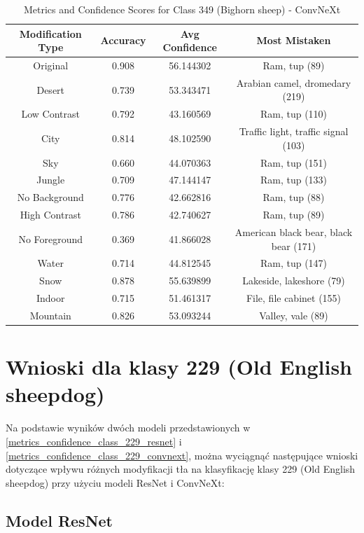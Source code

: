 \begin{table}
	\centering
	\begin{tabular}{|c|c|c|c|}
		\hline
		\textbf{Modification Type} & \textbf{Accuracy} & \textbf{Avg Confidence} & \textbf{Most Mistaken} \\
		\hline
		Original & 0.908 & 56.144302 & Ram, tup (89) \\
		\hline
		Desert & 0.739 & 53.343471 & Arabian camel, dromedary (219) \\
		\hline
		Low Contrast & 0.792 & 43.160569 & Ram, tup (110) \\
		\hline
		City & 0.814 & 48.102590 & Traffic light, traffic signal (103) \\
		\hline
		Sky & 0.660 & 44.070363 & Ram, tup (151) \\
		\hline
		Jungle & 0.709 & 47.144147 & Ram, tup (133) \\
		\hline
		No Background & 0.776 & 42.662816 & Ram, tup (88) \\
		\hline
		High Contrast & 0.786 & 42.740627 & Ram, tup (89) \\
		\hline
		No Foreground & 0.369 & 41.866028 & American black bear, black bear (171) \\
		\hline
		Water & 0.714 & 44.812545 & Ram, tup (147) \\
		\hline
		Snow & 0.878 & 55.639899 & Lakeside, lakeshore (79) \\
		\hline
		Indoor & 0.715 & 51.461317 & File, file cabinet (155) \\
		\hline
		Mountain & 0.826 & 53.093244 & Valley, vale (89) \\
		\hline
	\end{tabular}
	\caption{Metrics and Confidence Scores for Class 349 (Bighorn sheep) - ConvNeXt}
	\label{tab:metrics_confidence_class_349_convnext}
\end{table}

\section*{Wnioski dla klasy 229 (Old English sheepdog)}

Na podstawie wyników dwóch modeli przedstawionych w \ref*{metrics_confidence_class_229_resnet} i \ref*{metrics_confidence_class_229_convnext}, można wyciągnąć następujące wnioski dotyczące wpływu różnych 
modyfikacji tła na klasyfikację klasy 229 (Old English sheepdog) przy użyciu modeli ResNet i ConvNeXt:

\subsection*{Model ResNet}


